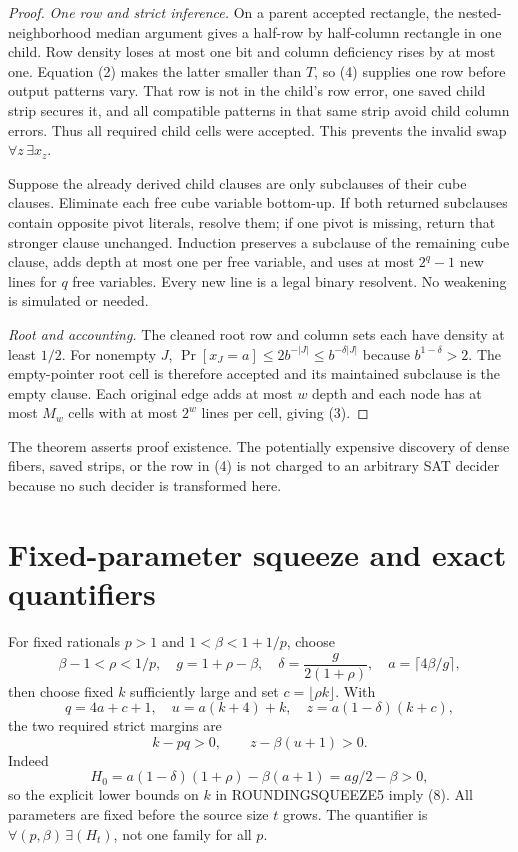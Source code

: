 \documentclass[11pt]{article}
\begin{document}
\begin{proof}
\emph{One row and strict inference.}  On a parent accepted rectangle, the
nested-neighborhood median argument gives a half-row by half-column
rectangle in one child.  Row density loses at most one bit and column
deficiency rises by at most one.  Equation (2) makes the latter smaller
than $T$, so (4) supplies one row before output patterns vary.  That row is
not in the child's row error, one saved child strip secures it, and all
compatible patterns in that same strip avoid child column errors.  Thus all
required child cells were accepted.  This prevents the invalid swap
$\forall z\,\exists x_z$.

Suppose the already derived child clauses are only subclauses of their cube
clauses.  Eliminate each free cube variable bottom-up.  If both returned
subclauses contain opposite pivot literals, resolve them; if one pivot is
missing, return that stronger clause unchanged.  Induction preserves a
subclause of the remaining cube clause, adds depth at most one per free
variable, and uses at most $2^q-1$ new lines for $q$ free variables.  Every
new line is a legal binary resolvent.  No weakening is simulated or needed.

\emph{Root and accounting.}  The cleaned root row and column sets each have
density at least $1/2$.  For nonempty $J$,
$\Pr[x_J=a]\le2b^{-|J|}\le b^{-\delta|J|}$ because
$b^{1-\delta}>2$.  The empty-pointer root cell is therefore accepted and
its maintained subclause is the empty clause.  Each original edge adds at
most $w$ depth and each node has at most $M_w$ cells with at most $2^w$
lines per cell, giving (3).
\end{proof}

The theorem asserts proof existence.  The potentially expensive discovery
of dense fibers, saved strips, or the row in (4) is not charged to an
arbitrary SAT decider because no such decider is transformed here.

\section{Fixed-parameter squeeze and exact quantifiers}
For fixed rationals $p>1$ and $1<\beta<1+1/p$, choose
\[
 \beta-1<\rho<1/p,
 \quad g=1+\rho-\beta,
 \quad \delta=\frac{g}{2(1+\rho)},
 \quad a=\lceil4\beta/g\rceil,                           \tag{6}
\]
then choose fixed $k$ sufficiently large and set $c=\lfloor\rho k\rfloor$.
With
\[
 q=4a+c+1,\quad u=a(k+4)+k,
 \quad z=a(1-\delta)(k+c),                               \tag{7}
\]
the two required strict margins are
\[
                      k-pq>0,
 \qquad                z-\beta(u+1)>0.                  \tag{8}
\]
Indeed
\[
 H_0=a(1-\delta)(1+\rho)-\beta(a+1)=ag/2-\beta>0,
\]
so the explicit lower bounds on $k$ in ROUNDINGSQUEEZE5 imply (8).  All
parameters are fixed before the source size $t$ grows.  The quantifier is
$\forall(p,\beta)\,\exists(H_t)$, not one family for all $p$.
\end{document}

